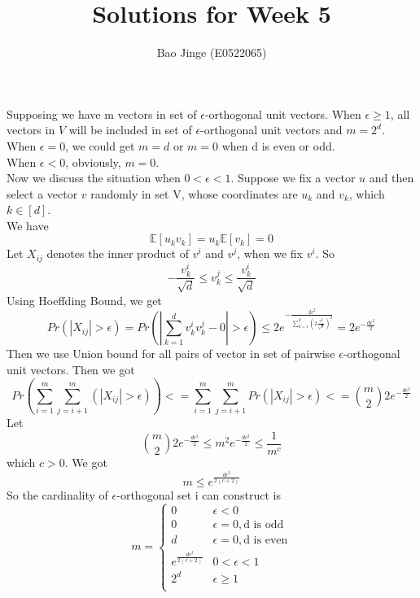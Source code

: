 \documentclass{article}
\author{Bao Jinge (E0522065)}
\title{Solutions for Week 5}
\date{}
\begin{document}
	\maketitle
	\section{}
	Supposing we have m vectors in set of $\epsilon$-orthogonal unit vectors.
	When $\epsilon \geq 1$, all vectors in $V$ will be included in set of $\epsilon$-orthogonal unit vectors and $m=2^d$.\\
	When $\epsilon = 0$, we could get $m=d$ or $m=0$ when d is even or odd.\\
	When $\epsilon < 0$, obviously, $m=0$.\\
	Now we discuss the situation when $0 < \epsilon < 1$.
	Suppose we fix a vector $u$ and then select a vector $v$ randomly in set V, whose coordinates are $u_k$ and $v_k$, which $k \in [d]$.\\
	We have
	$$\mathbb{E}[u_kv_k]=u_k\mathbb{E}[v_k]=0$$
	Let $X_{ij}$ denotes the inner product of $v^i$ and $v^j$, when we fix $v^i$. So $$-\frac{v_k^i}{\sqrt{d}} \leq v_k^j \leq \frac{v_k^i}{\sqrt{d}}$$
	Using Hoeffding Bound, we get
	$$Pr(\left|X_{ij}\right|>\epsilon) = Pr(|\sum_{k=1}^{d}v^i_kv^j_k-0|>\epsilon)\leq 2e^{-\frac{2\epsilon^2}{\sum_{k=1}^{d}(2\frac{v_i^k}{\sqrt{d}})^2}} = 2e^{-\frac{d\epsilon^2}{2}}$$
	Then we use Union bound for all pairs of vector in set of pairwise $\epsilon$-orthogonal unit vectors. Then we got
	$$Pr(\sum_{i=1}^{m}\sum_{j=i+1}^{m}(|X_{ij}|>\epsilon))<= \sum_{i=1}^{m}\sum_{j=i+1}^{m}Pr(|X_{ij}|>\epsilon) <= \binom{m}{2}2e^{-\frac{d\epsilon^2}{2}}$$
	Let 
	$$\binom{m}{2}2e^{-\frac{d\epsilon^2}{2}} \leq m^2e^{-\frac{d\epsilon^2}{2}} \leq \frac{1}{m^c}$$
	which $c>0$. We got
	$$m \leq e^{\frac{d\epsilon^2}{2(c+2)}}$$
	So the cardinality of $\epsilon$-orthogonal set i can construct is 
	$$m = 
	\begin{cases}
	0& \epsilon < 0\\
	0& \epsilon = 0, \text{d is odd}\\
	d& \epsilon = 0, \text{d is even}\\
	e^{\frac{d\epsilon^2}{2(c+2)}}& 0 < \epsilon < 1\\
	2^d& \epsilon \geq 1\\
	\end{cases}
	$$
	\section{}
\end{document}
